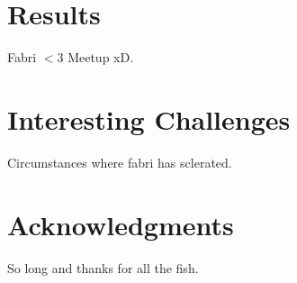 \documentclass[fleqn,10pt]{SelfArx} %
\begin{document}
\section{Results}

Fabri  $<$3 Meetup xD.
\section*{Interesting Challenges}
Circumstances where fabri has sclerated.
\section*{Acknowledgments} %


So long and thanks for all the fish.




\end{document}
